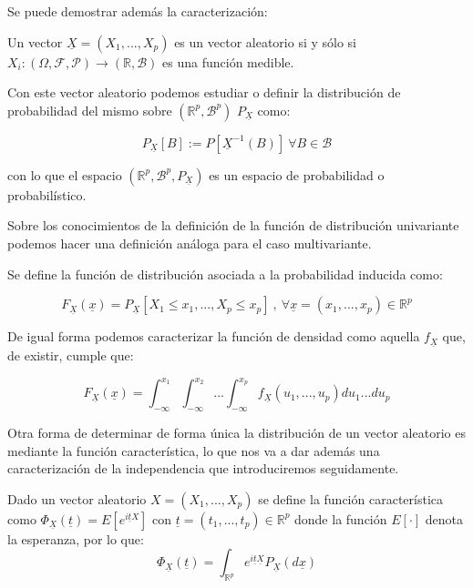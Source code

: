 Se puede demostrar además la caracterización:

\begin{proposicion}
	Un vector $\underline{X} = (X_1, ..., X_p)$ es un vector aleatorio si y sólo si $X_i : (\Omega , \mathcal{F}, \mathcal{P}) \rightarrow (\mathbb{R}, \mathcal{B})$ es una función medible.
\end{proposicion}

Con este vector aleatorio podemos estudiar o definir la distribución de probabilidad del mismo sobre $( \mathbb{R}^p , \mathcal{B}^p )$ $P_{\underline{X}}$ como:

$$P_{\underline{X}} [B]:= P[\underline{X}^{-1}(B)] \ \forall B\in \mathcal{B}$$

con lo que el espacio $(\mathbb{R}^p , \mathcal{B}^p , P_{\underline{X}})$ es un espacio de probabilidad o probabilístico.

Sobre los conocimientos de la definición de la función de distribución univariante podemos hacer una definición análoga para el caso multivariante.

\begin{definicion}
	Se define la función de distribución asociada a la probabilidad inducida como:
	
	$$F_{\underline{X}} (\underline{x}) = P_{\underline{X}} [X_1 \leq x_1 , ... , X_p \leq x_p] \ , \ \forall \underline{x} = (x_1 , ... , x_p) \in \mathbb{R}^p$$
\end{definicion}

De igual forma podemos caracterizar la función de densidad como aquella $f_{\underline{X}}$ que, de existir, cumple que:

$$F_{\underline{X}} (\underline{x}) = \int_{- \infty}^{x_1} \int_{-\infty}^{x_2} ... \int_{-\infty}^{x_p} f_{\underline{X}}(u_1 , ... , u_p) du_1 ... du_p$$

Otra forma de determinar de forma única la distribución de un vector aleatorio es mediante la función característica, lo que nos va a dar además una caracterización de la independencia que introduciremos seguidamente.

\begin{definicion}
	Dado un vector aleatorio $X = (X_1 , ... , X_p)$ se define la función característica como $\Phi_{\underline{X}} (\underline{t}) = E[e^{i\underline{t}X}]$ con $\underline{t} = (t_1 , ... , t_p)\in \mathbb{R}^p$ donde la función $E[\cdot]$ denota la esperanza, por lo que:
	$$\Phi_{\underline{X}} (\underline{t}) = \int_{\mathbb{R}^p} e^{i\underline{t} \underline{X}} P_{\underline{X}}(d\underline{x})$$
\end{definicion}

